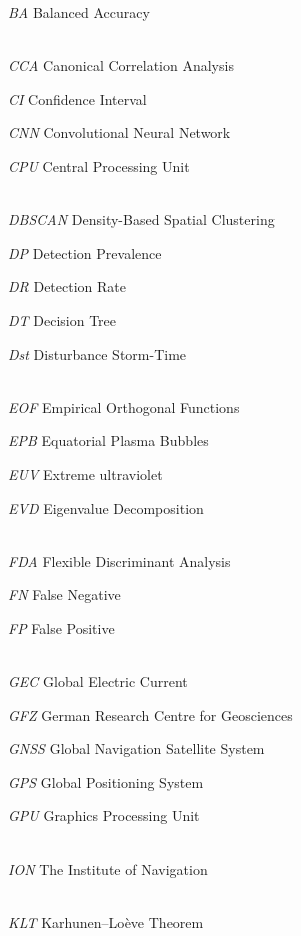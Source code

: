 \documentclass[sn-mathphys-num]{sn-jnl}%
\begin{document}
\textit{BA} Balanced Accuracy


\\[2\baselineskip]

\textit{CCA} Canonical Correlation Analysis

\textit{CI} Confidence Interval

\textit{CNN} Convolutional Neural Network

\textit{CPU} Central Processing Unit


\\[2\baselineskip]

\textit{DBSCAN} Density-Based Spatial Clustering

\textit{DP} Detection Prevalence

\textit{DR} Detection Rate

\textit{DT} Decision Tree

\textit{Dst} Disturbance Storm-Time


\\[2\baselineskip]

\textit{EOF} Empirical Orthogonal Functions

\textit{EPB} Equatorial Plasma Bubbles

\textit{EUV} Extreme ultraviolet

\textit{EVD} Eigenvalue Decomposition


\\[2\baselineskip]

\textit{FDA} Flexible Discriminant Analysis

\textit{FN} False Negative

\textit{FP} False Positive


\\[2\baselineskip]

\textit{GEC} Global Electric Current

\textit{GFZ} German Research Centre for Geosciences

\textit{GNSS} Global Navigation Satellite System

\textit{GPS} Global Positioning System

\textit{GPU} Graphics Processing Unit


\\[2\baselineskip]

\textit{ION} The Institute of Navigation


\\[2\baselineskip]

\textit{KLT} Karhunen–Loève Theorem


\\[2\baselineskip]
\end{document}
